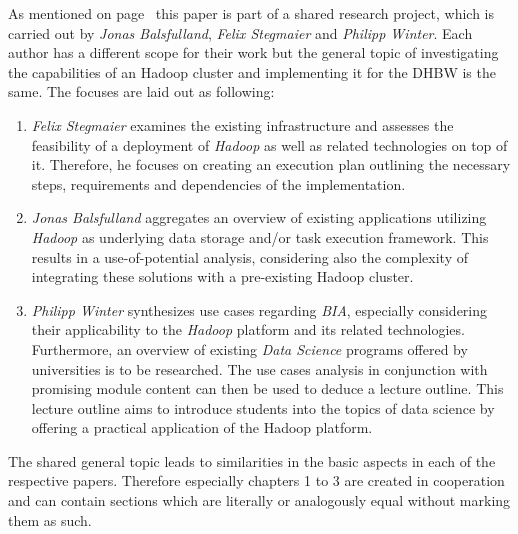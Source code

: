 
As mentioned on page~\pageref{chap:prenotes} this paper is part of a shared research project,
which is carried out by \emph{Jonas Balsfulland}, \emph{Felix Stegmaier} and \emph{Philipp Winter}.
Each author has a different scope for their work but the general topic of investigating the capabilities of an Hadoop cluster and implementing it for the \ac{DHBW} is the same.
The focuses are laid out as following:

\begin{enumerate}
	\item \emph{Felix Stegmaier} examines the existing infrastructure and assesses the feasibility of a deployment of \emph{Hadoop} as well as related technologies on top of it. Therefore, he focuses on creating an execution plan outlining the necessary steps, requirements and dependencies of the implementation.
	\item \emph{Jonas Balsfulland} aggregates an overview of existing applications utilizing \emph{Hadoop} as underlying data storage and/or task execution framework. This results in a use-of-potential analysis, considering also the complexity of integrating these solutions with a pre-existing Hadoop cluster.
	\item \emph{Philipp Winter} synthesizes use cases regarding \emph{\ac{BIA}}, especially considering their applicability to the \emph{Hadoop} platform and its related technologies. Furthermore, an overview of existing \emph{Data Science} programs offered by universities is to be researched. The use cases analysis in conjunction with promising module content can then be used to deduce a lecture outline. This lecture outline aims to introduce students into the topics of data science by offering a practical application of the Hadoop platform.
\end{enumerate}

The shared general topic leads to similarities in the basic aspects in each of the respective papers. Therefore especially chapters 1 to 3 are created in cooperation 
and can contain sections which are literally or analogously equal without marking them as such.
